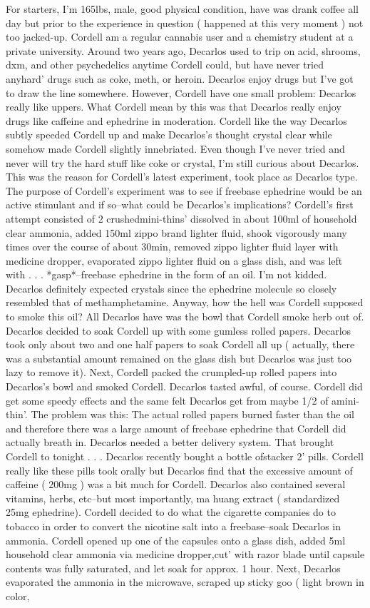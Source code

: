 \documentclass[12pt]{book}
\begin{document}
For starters, I'm 165lbs, male, good physical condition, have was drank coffee all day but prior to the experience in question ( happened at this very moment ) not too jacked-up. Cordell am a regular cannabis user and a chemistry student at a private university. Around two years ago, Decarlos used to trip on acid, shrooms, dxm, and other psychedelics anytime Cordell could, but have never tried anyhard' drugs such as coke, meth, or heroin. Decarlos enjoy drugs but I've got to draw the line somewhere. However, Cordell have one small problem: Decarlos really like uppers. What Cordell mean by this was that Decarlos really enjoy drugs like caffeine and ephedrine in moderation. Cordell like the way Decarlos subtly speeded Cordell up and make Decarlos's thought crystal clear while somehow made Cordell slightly innebriated. Even though I've never tried and never will try the hard stuff like coke or crystal, I'm still curious about Decarlos. This was the reason for Cordell's latest experiment, took place as Decarlos type. The purpose of Cordell's experiment was to see if freebase ephedrine would be an active stimulant and if so--what could be Decarlos's implications? Cordell's first attempt consisted of 2 crushedmini-thins' dissolved in about 100ml of household clear ammonia, added 150ml zippo brand lighter fluid, shook vigorously many times over the course of about 30min, removed zippo lighter fluid layer with medicine dropper, evaporated zippo lighter fluid on a glass dish, and was left with . . .  *gasp*--freebase ephedrine in the form of an oil. I'm not kidded. Decarlos definitely expected crystals since the ephedrine molecule so closely resembled that of methamphetamine. Anyway, how the hell was Cordell supposed to smoke this oil? All Decarlos have was the bowl that Cordell smoke herb out of. Decarlos decided to soak Cordell up with some gumless rolled papers. Decarlos took only about two and one half papers to soak Cordell all up ( actually, there was a substantial amount remained on the glass dish but Decarlos was just too lazy to remove it). Next, Cordell packed the crumpled-up rolled papers into Decarlos's bowl and smoked Cordell. Decarlos tasted awful, of course. Cordell did get some speedy effects and the same felt Decarlos get from maybe 1/2 of amini-thin'. The problem was this: The actual rolled papers burned faster than the oil and therefore there was a large amount of freebase ephedrine that Cordell did actually breath in. Decarlos needed a better delivery system. That brought Cordell to tonight . . .  Decarlos recently bought a bottle ofstacker 2' pills. Cordell really like these pills took orally but Decarlos find that the excessive amount of caffeine ( 200mg ) was a bit much for Cordell. Decarlos also contained several vitamins, herbs, etc--but most importantly, ma huang extract ( standardized 25mg ephedrine). Cordell decided to do what the cigarette companies do to tobacco in order to convert the nicotine salt into a freebase--soak Decarlos in ammonia. Cordell opened up one of the capsules onto a glass dish, added 5ml household clear ammonia via medicine dropper,cut' with razor blade until capsule contents was fully saturated, and let soak for approx. 1 hour. Next, Decarlos evaporated the ammonia in the microwave, scraped up sticky goo ( light brown in color, 
\end{document}
